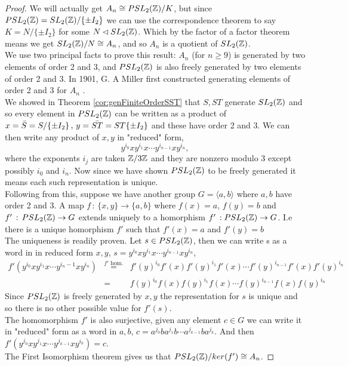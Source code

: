 \begin{proof}
We will actually get $A_n \cong \psltz / K$, but since $\psltz = \sltz / \{\pm I_2\}$ we can use the correspondence theorem to say $K = N / \{\pm I_2\}$ for some $N \lhd \sltz$. Which by the factor of a factor theorem means we get $ \sltz / N \cong A_n$, and so $A_n$ is a quotient of $\sltz$.\\
We use two principal facts to prove this result: $A_n$ (for $n\geq 9$) is generated by two elements of order 2 and 3, and $\psltz$ is also freely generated by two elements of order 2 and 3. In 1901, G. A Miller first constructed generating elements of order 2 and 3 for $A_n$ \citep{miller}. \\
We showed in Theorem \ref{cor:genFiniteOrderSST} that $S, ST$ generate $\sltz$ and so every element in $\psltz$ can be written as a product of $x = \bar{S} = S/\pmi\, ,\, y= \bar{ST} = ST \pmi$ and these have order 2 and 3. We can then write any product of $x,y$ in "reduced" form,
$$ y^{i_0}xy^{i_1}x \cdots y^{i_{n-1}}xy^{i_n},$$
where the exponents $i_j$ are taken $\znz[3]$ and they are nonzero modulo 3 except possibly $i_0$ and $i_n$. Now since we have shown $\psltz$ to be freely generated it means each such representation is unique. \\
Following from this, suppose we have another group $G = \langle a ,b \rangle$ where $a,b$ have order 2 and 3. A map $f \, : \, \{x, y\} \rightarrow \{a , b\}$ where $f(x) = a, \, f(y) = b$ and $f' \, : \, \psltz \rightarrow G$ extends uniquely to a homorphism $f' \, : \psltz \rightarrow G$. I.e there is a unique homorphism $f'$ such that $f'(x) =a$ and $f'(y) = b$\\
The uniqueness is readily proven. Let $ s \in \psltz$, then we can write s as a word in in reduced form $x,y$, $s = y^{i_0}xy^{i_1}x \cdots y^{i_{n-1}}xy^{i_n}$,  
\begin{eqnarray*}
f'(y^{i_0}xy^{i_1}x \cdots y^{i_n-1}xy^{i_n}) &\stackrel{f'\text{ hom.}}{=}& f'(y)^{i_0}f'(x)f'(y)^{i_1}f'(x) \cdots f'(y)^{i_{n-1}}f'(x)f'(y)^{i_n} \\
&=& f(y)^{i_0}f(x)f(y)^{i_1}f(x) \cdots f(y)^{i_{n-1}}f(x)f(y)^{i_n}
\end{eqnarray*} 
Since $\psltz$ is freely generated by $x, y$ the representation for $s$ is unique and so there is no other possible value for $f'(s)$. \\
The homomorphism $f'$ is also surjective, given any element $c \in G$ we can write it in "reduced" form as a word in $a,b$, $c = a^{j_0}ba^{j_1}b\cdots a^{j_{k-1}}ba^{j_k}$. And then $f'(y^{j_0}xy^{j_1}x \cdots y^{j_{k-1}}xy^{i_k}) = c$.\\
The First Isomorphism theorem gives us that $\psltz / ker(f') \cong A_n$.
\end{proof}

